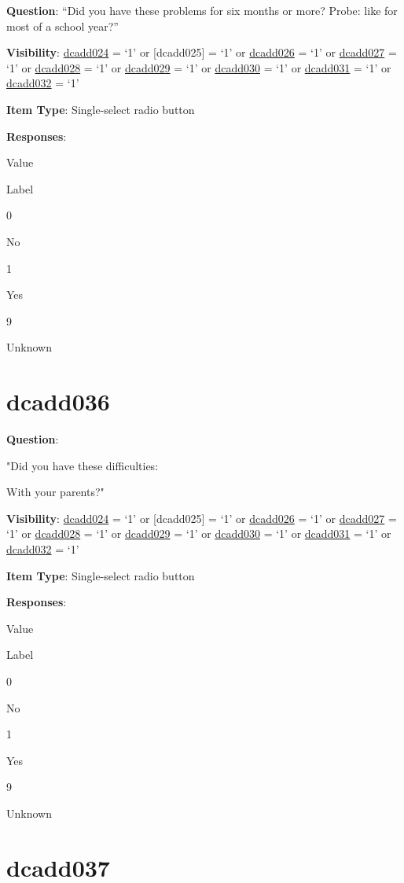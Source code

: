 \documentclass[]{book}
\begin{document}
\textbf{Question}: ``Did you have these problems for six months or more? Probe: like for most of a school year?''

\textbf{Visibility}: \protect\hyperlink{dcadd024}{dcadd024} = `1' or {[}dcadd025{]} = `1' or \protect\hyperlink{dcadd026}{dcadd026} = `1' or \protect\hyperlink{dcadd027}{dcadd027} = `1' or \protect\hyperlink{dcadd028}{dcadd028} = `1' or \protect\hyperlink{dcadd029}{dcadd029} = `1' or \protect\hyperlink{dcadd030}{dcadd030} = `1' or \protect\hyperlink{dcadd031}{dcadd031} = `1' or \protect\hyperlink{dcadd032}{dcadd032} = `1'

\textbf{Item Type}: Single-select radio button

\textbf{Responses}:

Value

Label

0

No

1

Yes

9

Unknown

\hypertarget{dcadd036}{%
\section{dcadd036}\label{dcadd036}}

\textbf{Question}:

"Did you have these difficulties:

With your parents?"

\textbf{Visibility}: \protect\hyperlink{dcadd024}{dcadd024} = `1' or {[}dcadd025{]} = `1' or \protect\hyperlink{dcadd026}{dcadd026} = `1' or \protect\hyperlink{dcadd027}{dcadd027} = `1' or \protect\hyperlink{dcadd028}{dcadd028} = `1' or \protect\hyperlink{dcadd029}{dcadd029} = `1' or \protect\hyperlink{dcadd030}{dcadd030} = `1' or \protect\hyperlink{dcadd031}{dcadd031} = `1' or \protect\hyperlink{dcadd032}{dcadd032} = `1'

\textbf{Item Type}: Single-select radio button

\textbf{Responses}:

Value

Label

0

No

1

Yes

9

Unknown

\hypertarget{dcadd037}{%
\section{dcadd037}\label{dcadd037}}
\end{document}
